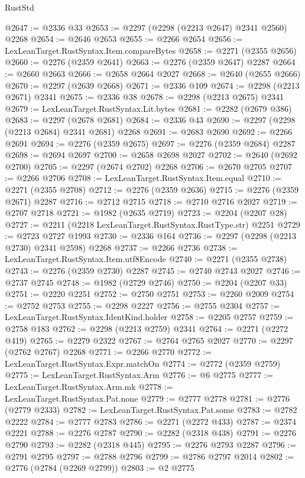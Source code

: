 \begin{lexlean}{RustStd}
\begin{coremodule}
{\begin{coremodule}
{{{{{{{{{{{{{{{{{{{{{{{{{{{{{{{{{{{{{{{{{{{{{{{{{{{{{{@2647 := @2336 @33
@2653 := @2297 (@2298 (@2213 @2647) @2341 @2560) @2268
@2654 := @2646 @2653
@2655 := @2266 @2654
@2656 := LexLeanTarget.RustSyntax.Item.compareBytes
@2658 := @2271 (@2355 @2656)
@2660 := @2276 (@2359 @2641)
@2663 := @2276 (@2359 @2647) @2287
@2664 := @2660 @2663
@2666 := @2658 @2664 @2027
@2668 := @2640 (@2655 @2666)
@2670 := @2297 (@2639 @2668)
@2671 := @2336 @109
@2674 := @2298 (@2213 @2671) @2341
@2675 := @2336 @38
@2678 := @2298 (@2213 @2675) @2341
@2679 := LexLeanTarget.RustSyntax.Lit.bytes
@2681 := @2282 (@2679 @386)
@2683 := @2297 (@2678 @2681)
@2684 := @2336 @43
@2690 := @2297 (@2298 (@2213 @2684) @2341 @2681) @2268
@2691 := @2683 @2690
@2692 := @2266 @2691
@2694 := @2276 (@2359 @2675)
@2697 := @2276 (@2359 @2684) @2287
@2698 := @2694 @2697
@2700 := @2658 @2698 @2027
@2702 := @2640 (@2692 @2700)
@2705 := @2297 (@2674 @2702) @2268
@2706 := @2670 @2705
@2707 := @2266 @2706
@2708 := LexLeanTarget.RustSyntax.Item.equal
@2710 := @2271 (@2355 @2708)
@2712 := @2276 (@2359 @2636)
@2715 := @2276 (@2359 @2671) @2287
@2716 := @2712 @2715
@2718 := @2710 @2716 @2027
@2719 := @2707 @2718
@2721 := @1982 (@2635 @2719)
@2723 := @2204 (@2207 @28)
@2727 := @2211 (@2218 LexLeanTarget.RustSyntax.RustType.str) @2251
@2729 := @2723 @2727 @1993
@2730 := @2336 @164
@2736 := @2297 (@2298 (@2213 @2730) @2341 @2598) @2268
@2737 := @2266 @2736
@2738 := LexLeanTarget.RustSyntax.Item.utf8Encode
@2740 := @2271 (@2355 @2738)
@2743 := @2276 (@2359 @2730) @2287
@2745 := @2740 @2743 @2027
@2746 := @2737 @2745
@2748 := @1982 (@2729 @2746)
@2750 := @2204 (@2207 @33)
@2751 := @2220 @2251
@2752 := @2750 @2751
@2753 := @2260 @2009
@2754 := @2752 @2753
@2755 := @2298 @2227
@2756 := @2755 @2304
@2757 := LexLeanTarget.RustSyntax.IdentKind.holder
@2758 := @2205 @2757
@2759 := @2758 @183
@2762 := @2298 (@2213 @2759) @2341
@2764 := @2271 (@2272 @419)
@2765 := @2279 @2322
@2767 := @2764 @2765 @2027
@2770 := @2297 (@2762 @2767) @2268
@2771 := @2266 @2770
@2772 := LexLeanTarget.RustSyntax.Expr.matchOn
@2774 := @2772 (@2359 @2759)
@2775 := LexLeanTarget.RustSyntax.Arm
@2776 := @6 @2775
@2777 := LexLeanTarget.RustSyntax.Arm.mk
@2778 := LexLeanTarget.RustSyntax.Pat.none
@2779 := @2777 @2778
@2781 := @2776 (@2779 @2333)
@2782 := LexLeanTarget.RustSyntax.Pat.some
@2783 := @2782 @2222
@2784 := @2777 @2783
@2786 := @2271 (@2272 @433)
@2787 := @2374 @2221
@2788 := @2276 @2787
@2790 := @2282 (@2318 @438)
@2791 := @2276 @2790
@2793 := @2282 (@2318 @445)
@2795 := @2276 @2793 @2287
@2796 := @2791 @2795
@2797 := @2788 @2796
@2799 := @2786 @2797 @2014
@2802 := @2776 (@2784 (@2269 @2799))
@2803 := @2 @2775
}}}}}}}}}}}}}}}}}}}}}}}}}}}}}}}}}}}}}}}}}}}}}}}}}}}}}}
\end{coremodule}}
\end{coremodule}
\end{lexlean}
